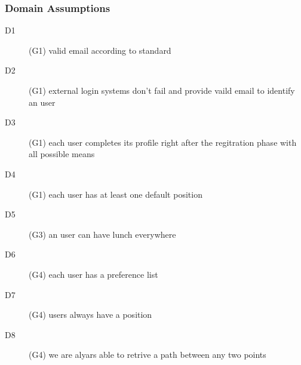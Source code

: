 \subsubsection{Domain Assumptions}

\begin{description}
\item[D1] (G1) valid email according to standard
\item[D2] (G1) external login systems don’t fail and provide vaild email to identify an user
\item[D3] (G1) each user completes its profile right after the regitration phase with all possible means
\item[D4] (G1) each user has at least one default position
\item[D5] (G3) an user can have lunch everywhere
\item[D6] (G4) each user has a preference list
\item[D7] (G4) users always have a position
\item[D8] (G4) we are alyars able to retrive a path between any two points
\end{description}
